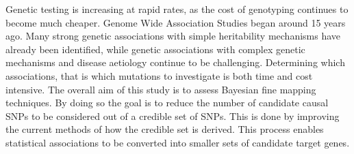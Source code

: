 
Genetic testing is increasing at rapid rates, as the cost of genotyping continues to become much cheaper. Genome Wide Association Studies began around 15 years ago. Many strong genetic associations with simple heritability mechanisms have already been identified, while genetic associations with complex genetic mechanisms and disease aetiology continue to be challenging. Determining which associations, that is which mutations to investigate is both time and cost intensive. The overall aim of this study is to assess Bayesian fine mapping techniques. By doing so the goal is to reduce the number of candidate causal SNPs to be considered out of a credible set of SNPs. This is done by improving the current methods of how the credible set is derived. This process enables statistical associations to be converted into smaller sets of candidate target genes. 